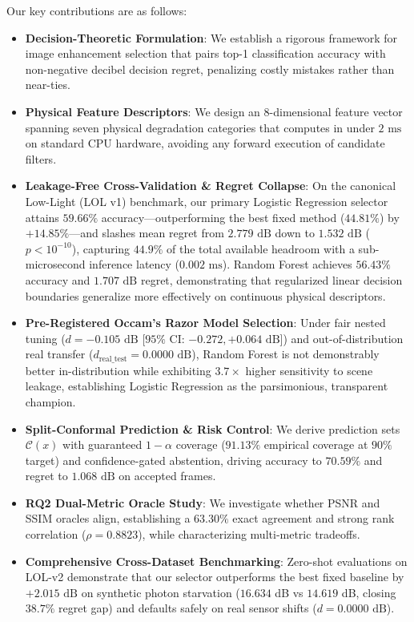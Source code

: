 \documentclass[journal]{IEEEtran}
\begin{document}
Our key contributions are as follows:
\begin{itemize}
    \item \textbf{Decision-Theoretic Formulation}: We establish a rigorous framework for image enhancement selection that pairs top-1 classification accuracy with non-negative decibel decision regret, penalizing costly mistakes rather than near-ties.
    \item \textbf{Physical Feature Descriptors}: We design an 8-dimensional feature vector spanning seven physical degradation categories that computes in under $2\text{ ms}$ on standard CPU hardware, avoiding any forward execution of candidate filters.
    \item \textbf{Leakage-Free Cross-Validation \& Regret Collapse}: On the canonical Low-Light (LOL v1) benchmark, our primary Logistic Regression selector attains $59.66\%$ accuracy—outperforming the best fixed method ($44.81\%$) by $+14.85\%$—and slashes mean regret from $2.779\text{ dB}$ down to $1.532\text{ dB}$ ($p < 10^{-10}$), capturing $44.9\%$ of the total available headroom with a sub-microsecond inference latency ($0.002\text{ ms}$). Random Forest achieves $56.43\%$ accuracy and $1.707\text{ dB}$ regret, demonstrating that regularized linear decision boundaries generalize more effectively on continuous physical descriptors.
    \item \textbf{Pre-Registered Occam's Razor Model Selection}: Under fair nested tuning ($d = -0.105\text{ dB}$ [$95\%$ CI: $-0.272, +0.064\text{ dB}$]) and out-of-distribution real transfer ($d_{\text{real\_test}} = 0.0000\text{ dB}$), Random Forest is not demonstrably better in-distribution while exhibiting $3.7\times$ higher sensitivity to scene leakage, establishing Logistic Regression as the parsimonious, transparent champion.
    \item \textbf{Split-Conformal Prediction \& Risk Control}: We derive prediction sets $\mathcal{C}(x)$ with guaranteed $1 - \alpha$ coverage ($91.13\%$ empirical coverage at $90\%$ target) and confidence-gated abstention, driving accuracy to $70.59\%$ and regret to $1.068\text{ dB}$ on accepted frames.
    \item \textbf{RQ2 Dual-Metric Oracle Study}: We investigate whether PSNR and SSIM oracles align, establishing a $63.30\%$ exact agreement and strong rank correlation ($\rho = 0.8823$), while characterizing multi-metric tradeoffs.
    \item \textbf{Comprehensive Cross-Dataset Benchmarking}: Zero-shot evaluations on LOL-v2 demonstrate that our selector outperforms the best fixed baseline by $+2.015\text{ dB}$ on synthetic photon starvation ($16.634$ dB vs $14.619$ dB, closing $38.7\%$ regret gap) and defaults safely on real sensor shifts ($d = 0.0000\text{ dB}$).

\end{itemize}
\end{document}
